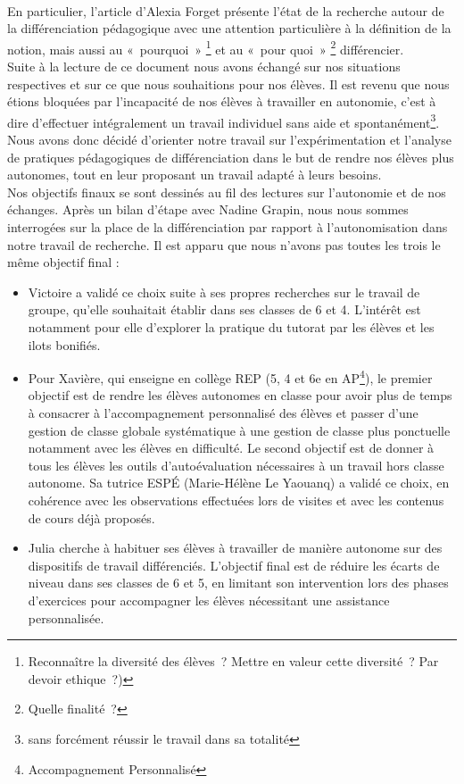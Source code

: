 \paragraph{}En particulier, l'article d'Alexia Forget\cite{cnesco_etat_lieux} présente l'état de la recherche autour de la différenciation pédagogique avec une attention particulière à la définition de la notion, mais aussi au « pourquoi » \footnote{Reconnaître la diversité des élèves ? Mettre en valeur cette diversité ? Par devoir ethique ?)} et au « pour quoi » \footnote{Quelle finalité ?} différencier.\\
Suite à la lecture de ce document nous avons échangé sur nos situations respectives et sur ce que nous souhaitions pour nos élèves. Il est revenu que nous étions bloquées par l'incapacité de nos élèves à travailler en autonomie, c'est à dire d'effectuer intégralement un travail individuel sans aide et spontanément\footnote{sans forcément réussir le travail dans sa totalité}. Nous avons donc décidé d'orienter notre travail sur l'expérimentation et l'analyse de pratiques pédagogiques de différenciation dans le but de rendre nos élèves plus autonomes, tout en leur proposant un travail adapté à leurs besoins.\\
Nos objectifs finaux se sont dessinés au fil des lectures sur l'autonomie\cite{Meirieu_autonomie}\cite{ilots_bonifies} et de nos échanges. Après un bilan d'étape avec Nadine Grapin, nous nous sommes interrogées sur la place de la différenciation par rapport à l’autonomisation dans notre travail de recherche. Il est apparu que nous n'avons pas toutes les trois le même objectif final :
\begin{itemize}
	\item Victoire a validé ce choix suite à ses propres recherches sur le travail de groupe, qu’elle souhaitait établir dans ses classes de 6 et 4. L’intérêt est notamment pour elle d’explorer la pratique du tutorat par les élèves et les ilots bonifiés.
	\item {} Pour Xavière, qui enseigne en collège REP (5, 4 et 6{e} en AP\footnote{Accompagnement Personnalisé}),  le premier objectif est de rendre les élèves autonomes en classe pour avoir plus de temps à consacrer à l’accompagnement personnalisé des élèves et passer d’une gestion de classe globale systématique à une gestion de classe plus ponctuelle notamment avec les élèves en difficulté. Le second objectif est de donner à tous les élèves les outils d’autoévaluation nécessaires à un travail hors classe autonome. Sa tutrice ESPÉ (Marie-Hélène Le Yaouanq) a validé ce choix, en cohérence avec les observations effectuées lors de visites et avec les contenus de cours déjà proposés.
	\item  Julia cherche à habituer ses élèves à travailler de manière autonome sur des dispositifs de travail différenciés. L'objectif final est de réduire les écarts de niveau dans ses classes de 6 et 5, en limitant son intervention lors des phases d’exercices pour accompagner les élèves nécessitant une assistance personnalisée.
\end{itemize}
